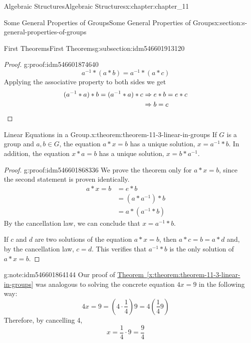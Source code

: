 \documentclass[oneside,10pt,]{book}
\newcommand{\xreffont}{\relax}
\newcommand{\qedhere}{\relax}
\numberwithin{equation}{section}
\begin{document}
\begin{chapterptx}{Algebraic Structures}{}{Algebraic Structures}{}{}{x:chapter:chapter_11}
\begin{sectionptx}{Some General Properties of Groups}{}{Some General Properties of Groups}{}{}{x:section:s-general-properties-of-groups}
\begin{subsectionptx}{First Theorems}{}{First Theorems}{}{}{g:subsection:idm546601913120}
\begin{proof}{}{g:proof:idm546601874640}
\begin{equation*}
a^{-1}* (a * b) = a^{-1} * (a * c)
\end{equation*}
Applying the associative property to both sides we get%
\begin{equation*}
\begin{split}
(a^{-1} * a) * b = (a^{-1} * a) * c &  \Rightarrow e * b = e * c\\
& \Rightarrow  b = c
\end{split}\qedhere
\end{equation*}
%
\end{proof}
\begin{theorem}{Linear Equations in a Group.}{}{x:theorem:theorem-11-3-linear-in-groups}%
%
If \(G\) is a group and \(a, b \in  G\), the equation \(a * x = b\) has a unique solution, \(x
= a^{-1} * b\).  In addition, the equation \(x * a = b\) has a unique solution, \(x = b * a^{-1}\).%
\end{theorem}
\begin{proof}{}{g:proof:idm546601868336}
We prove the theorem only for \(a * x = b\), since the second statement is proven identically.%
\begin{equation*}
\begin{split}
a*x = b & =e * b\\
&= (a* a^{-1}) * b \\
& = a * (a^{-1} * b)
\end{split}
\end{equation*}
By the cancellation law, we can conclude that \(x = a ^{-1} * b\).%
\par
If \(c\) and \(d\) are two solutions of the equation \(a * x = b\), then \(a * c = b = a * d\) and, by the cancellation law, \(c = d\).  This verifies that \(a ^{-1} * b\) is the only solution of \(a * x = b\).%
\end{proof}
\begin{note}{}{g:note:idm546601864144}%
Our proof of \hyperref[x:theorem:theorem-11-3-linear-in-groups]{Theorem~{\xreffont\ref{x:theorem:theorem-11-3-linear-in-groups}}} was analogous to solving the concrete equation \(4x = 9\) in the following way:%
\begin{equation*}
4 x=9=\left(4\cdot \frac{1}{4}\right)9=4\left(\frac{1}{4}9\right)
\end{equation*}
Therefore, by cancelling 4,%
\begin{equation*}
x = \frac{1}{4}\cdot  9 = \frac{9}{4}
\end{equation*}

\end{note}
\end{subsectionptx}
\end{sectionptx}
\end{chapterptx}
\end{document}
